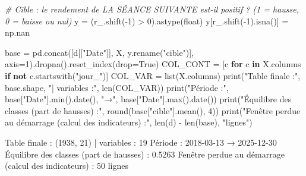 \documentclass[
  10pt,
]{article}
\newenvironment{Shaded}{}{}
\newcommand{\BuiltInTok}[1]{\textcolor[rgb]{0.00,0.50,0.00}{#1}}
\newcommand{\CommentTok}[1]{\textcolor[rgb]{0.38,0.63,0.69}{\textit{#1}}}
\newcommand{\ControlFlowTok}[1]{\textcolor[rgb]{0.00,0.44,0.13}{\textbf{#1}}}
\newcommand{\DecValTok}[1]{\textcolor[rgb]{0.25,0.63,0.44}{#1}}
\newcommand{\KeywordTok}[1]{\textcolor[rgb]{0.00,0.44,0.13}{\textbf{#1}}}
\newcommand{\NormalTok}[1]{#1}
\newcommand{\OperatorTok}[1]{\textcolor[rgb]{0.40,0.40,0.40}{#1}}
\newcommand{\StringTok}[1]{\textcolor[rgb]{0.25,0.44,0.63}{#1}}
\newcommand{\VariableTok}[1]{\textcolor[rgb]{0.10,0.09,0.49}{#1}}
\begin{document}
\begin{Shaded}
\begin{Highlighting}[]
\CommentTok{\# Cible : le rendement de LA SÉANCE SUIVANTE est{-}il positif ?  (1 = hausse, 0 = baisse ou nul)}
\NormalTok{y }\OperatorTok{=}\NormalTok{ (r\_.shift(}\OperatorTok{{-}}\DecValTok{1}\NormalTok{) }\OperatorTok{\textgreater{}} \DecValTok{0}\NormalTok{).astype(}\BuiltInTok{float}\NormalTok{)}
\NormalTok{y[r\_.shift(}\OperatorTok{{-}}\DecValTok{1}\NormalTok{).isna()] }\OperatorTok{=}\NormalTok{ np.nan}

\NormalTok{base }\OperatorTok{=}\NormalTok{ pd.concat([d[[}\StringTok{"Date"}\NormalTok{]], X, y.rename(}\StringTok{"cible"}\NormalTok{)], axis}\OperatorTok{=}\DecValTok{1}\NormalTok{).dropna().reset\_index(drop}\OperatorTok{=}\VariableTok{True}\NormalTok{)}
\NormalTok{COL\_CONT }\OperatorTok{=}\NormalTok{ [c }\ControlFlowTok{for}\NormalTok{ c }\KeywordTok{in}\NormalTok{ X.columns }\ControlFlowTok{if} \KeywordTok{not}\NormalTok{ c.startswith(}\StringTok{"jour\_"}\NormalTok{)]}
\NormalTok{COL\_VAR }\OperatorTok{=} \BuiltInTok{list}\NormalTok{(X.columns)}
\BuiltInTok{print}\NormalTok{(}\StringTok{"Table finale :"}\NormalTok{, base.shape, }\StringTok{"| variables :"}\NormalTok{, }\BuiltInTok{len}\NormalTok{(COL\_VAR))}
\BuiltInTok{print}\NormalTok{(}\StringTok{"Période :"}\NormalTok{, base[}\StringTok{"Date"}\NormalTok{].}\BuiltInTok{min}\NormalTok{().date(), }\StringTok{"→"}\NormalTok{, base[}\StringTok{"Date"}\NormalTok{].}\BuiltInTok{max}\NormalTok{().date())}
\BuiltInTok{print}\NormalTok{(}\StringTok{"Équilibre des classes (part de hausses) :"}\NormalTok{, }\BuiltInTok{round}\NormalTok{(base[}\StringTok{"cible"}\NormalTok{].mean(), }\DecValTok{4}\NormalTok{))}
\BuiltInTok{print}\NormalTok{(}\StringTok{"Fenêtre perdue au démarrage (calcul des indicateurs) :"}\NormalTok{, }\BuiltInTok{len}\NormalTok{(d) }\OperatorTok{{-}} \BuiltInTok{len}\NormalTok{(base), }\StringTok{"lignes"}\NormalTok{)}
\end{Highlighting}
\end{Shaded}

\begin{Shaded}
\begin{Highlighting}[]
\NormalTok{Table finale : (1938, 21) | variables : 19}
\NormalTok{Période : 2018{-}03{-}13 → 2025{-}12{-}30}
\NormalTok{Équilibre des classes (part de hausses) : 0.5263}
\NormalTok{Fenêtre perdue au démarrage (calcul des indicateurs) : 50 lignes}
\end{Highlighting}
\end{Shaded}
\end{document}
